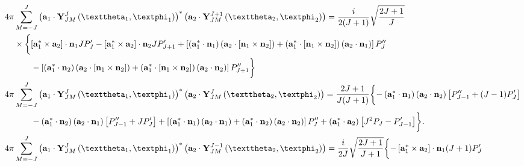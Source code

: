 \begin{enumerate}[label=(\alph*)]
\begin{fleqn}
\begin{subequations}
\begin{align}
 4 \pi &\sum_{M=-J}^{J}\left(\vect{a}_{1} \cdot \vect{Y}_{J M}^{J}\left(\vartheta_{1}, \varphi_{1}\right)\right)^{*}\left(\vect{a}_{2} \cdot \vect{Y}_{J M}^{J+1}\left(\vartheta_{2}, \varphi_{2}\right)\right)=\frac{i}{2(J+1)} \sqrt{\frac{2 J+1}{J}} \notag\\
& \times\biggl\{\left[\vect{a}_{1}^{*} \times \vect{a}_{2}\right] \cdot \vect{n}_{1} J P_{J}^{\prime}-\left[\vect{a}_{1}^{*} \times \vect{a}_{2}\right] \cdot \vect{n}_{2} J P_{J+1}^{\prime}+\left[\left(\vect{a}_{1}^{*} \cdot \vect{n}_{1}\right)\left(\vect{a}_{2} \cdot\left[\vect{n}_{1} \times \vect{n}_{2}\right]\right)+\left(\vect{a}_{1}^{*} \cdot\left[\vect{n}_{1} \times \vect{n}_{2}\right]\right)\left(\vect{a}_{2} \cdot \vect{n}_{1}\right)\right] P_{J}^{\prime \prime}\notag\\
& \qquad-\left[\left(\vect{a}_{1}^{*} \cdot \vect{n}_{2}\right)\left(\vect{a}_{2} \cdot\left[\vect{n}_{1} \times \vect{n}_{2}\right]\right)+\left(\vect{a}_{1}^{*} \cdot\left[\vect{n}_{1} \times \vect{n}_{2}\right]\right)\left(\vect{a}_{2} \cdot \vect{n}_{2}\right)\right] P_{J+1}^{\prime \prime}\biggr\}\\
    4 \pi& \sum_{M=-J}^{J}\left(\vect{a}_{1} \cdot \vect{Y}_{J M}^{J}\left(\vartheta_{1}, \varphi_{1}\right)\right)^{*}\left(\vect{a}_{2} \cdot \vect{Y}_{J M}^{J}\left(\vartheta_{2}, \varphi_{2}\right)\right)=\frac{2 J+1}{J(J+1)}\biggl\{-\left(\vect{a}_{1}^{*} \cdot \vect{n}_{1}\right)\left(\vect{a}_{2} \cdot \vect{n}_{2}\right)\left[P_{J-1}^{\prime \prime}+(J-1) P_{J}^{\prime}\right] \notag\\
& \qquad-\left(\vect{a}_{1}^{*} \cdot \vect{n}_{2}\right)\left(\vect{a}_{2} \cdot \vect{n}_{1}\right)\left[P_{J-1}^{\prime \prime}+J P_{J}^{\prime}\right]+\left[\left(\vect{a}_{1}^{*} \cdot \vect{n}_{1}\right)\left(\vect{a}_{2} \cdot \vect{n}_{1}\right)+\left(\vect{a}_{1}^{*} \cdot \vect{n}_{2}\right)\left(\vect{a}_{2} \cdot \vect{n}_{2}\right)\right] P_{J}^{\prime \prime}+\left(\vect{a}_{1}^{*} \cdot \vect{a}_{2}\right)\left[J^{2} P_{J}-P_{J-1}^{\prime}\right]\biggr\}. \\
 4 \pi &\sum_{M=-J}^{J}\left(\vect{a}_{1} \cdot \vect{Y}_{J M}^{J}\left(\vartheta_{1}, \varphi_{1}\right)\right)^{*}\left(\vect{a}_{2} \cdot \vect{Y}_{J M}^{J-1}\left(\vartheta_{2}, \varphi_{2}\right)\right)=\frac{i}{2 J} \sqrt{\frac{2 J+1}{J+1}}\biggl\{-\left[\vect{a}_{1}^{*} \times \vect{a}_{2}\right] \cdot \vect{n}_{1}(J+1) P_{J}^{\prime} \notag\\

\end{align}
\end{subequations}
\end{fleqn}
\end{enumerate}
